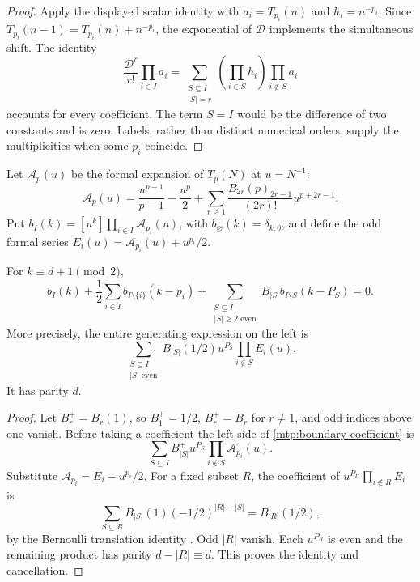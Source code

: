 \begin{proof}
Apply the displayed scalar identity with
$a_i=T_{p_i}(n)$ and $h_i=n^{-p_i}$. Since
$T_{p_i}(n-1)=T_{p_i}(n)+n^{-p_i}$, the exponential of $\mathscr D$
implements the simultaneous shift. The identity
\[
 \frac{\mathscr D^r}{r!}\prod_{i\in I}a_i
  =\sum_{\substack{S\subseteq I\\|S|=r}}
                  \left(\prod_{i\in S}h_i\right)\prod_{i\notin S}a_i
\]
accounts for every coefficient. The term $S=I$ would be the difference
of two constants and is zero. Labels, rather than distinct numerical
orders, supply the multiplicities when some $p_i$ coincide.
\end{proof}

Let $\mathcal A_p(u)$ be the formal expansion of $T_p(N)$ at $u=N^{-1}$:
\begin{equation}\label{mtp:unshifted}
 \mathcal A_p(u)=\frac{u^{p-1}}{p-1}-\frac{u^p}{2}
       +\sum_{r\ge1}\frac{B_{2r}(p)_{2r-1}}{(2r)!}u^{p+2r-1}.
\end{equation}
Put $b_I(k)=[u^k]\prod_{i\in I}\mathcal A_{p_i}(u)$, with
$b_\varnothing(k)=\delta_{k,0}$, and define the odd formal series
$E_i(u)=\mathcal A_{p_i}(u)+u^{p_i}/2$.

\begin{lemma}
\label{mtp:boundary}
For $k\equiv d+1\pmod2$,
\begin{equation}\label{mtp:boundary-coefficient}
 b_I(k)+\frac12\sum_{i\in I}b_{I\setminus\{i\}}(k-p_i)
 +\sum_{\substack{S\subseteq I\\|S|\ge2\text{ even}}}
                    B_{|S|}b_{I\setminus S}(k-P_S)=0.
\end{equation}
More precisely, the entire generating expression on the left is
\begin{equation}\label{mtp:boundary-polynomial}
 \boxed{\sum_{\substack{S\subseteq I\\|S|\text{ even}}}
             B_{|S|}(1/2)u^{P_S}\prod_{i\notin S}E_i(u).}
\end{equation}
It has parity $d$.
\end{lemma}

\begin{proof}
Let $B_r^+=B_r(1)$, so $B_1^+=1/2$, $B_r^+=B_r$ for $r\ne1$,
and odd indices above one vanish. Before taking a coefficient the
left side of \eqref{mtp:boundary-coefficient} is
\[
                 \sum_{S\subseteq I}B_{|S|}^+u^{P_S}
                              \prod_{i\notin S}\mathcal A_{p_i}(u).
\]
Substitute $\mathcal A_{p_i}=E_i-u^{p_i}/2$. For a fixed subset $R$,
the coefficient of $u^{P_R}\prod_{i\notin R}E_i$ is
\[
 \sum_{S\subseteq R}B_{|S|}(1)(-1/2)^{|R|-|S|}
      =B_{|R|}(1/2),
\]
by the Bernoulli translation identity \cite[24.4.12]{DLMF}.
Odd $|R|$ vanish. Each $u^{P_R}$ is even and the remaining product
has parity $d-|R|\equiv d$. This proves the identity and cancellation.
\end{proof}

